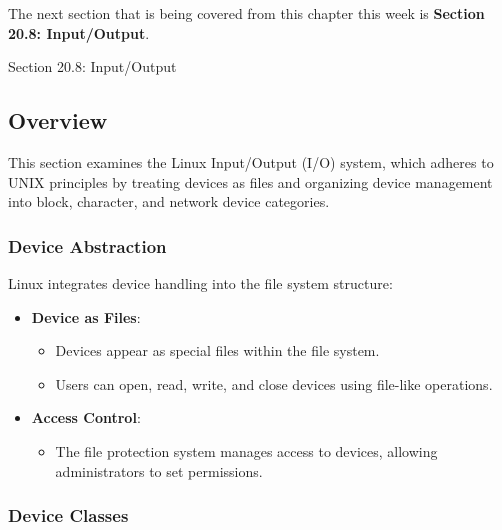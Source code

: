 The next section that is being covered from this chapter this week is \textbf{Section 20.8: Input/Output}.

\begin{notes}{Section 20.8: Input/Output}
    \subsection*{Overview}

    This section examines the Linux Input/Output (I/O) system, which adheres to UNIX principles by treating devices as files and organizing device management into block, character, and network device 
    categories.
    
    \subsubsection*{Device Abstraction}
    
    Linux integrates device handling into the file system structure:
    \begin{itemize}
        \item \textbf{Device as Files}:
        \begin{itemize}
            \item Devices appear as special files within the file system.
            \item Users can open, read, write, and close devices using file-like operations.
        \end{itemize}
        \item \textbf{Access Control}:
        \begin{itemize}
            \item The file protection system manages access to devices, allowing administrators to set permissions.
        \end{itemize}
    \end{itemize}
    
    \subsubsection*{Device Classes}
    

\end{notes}
